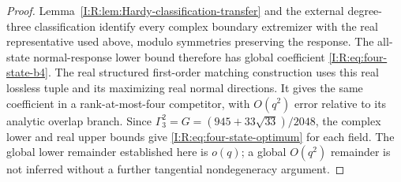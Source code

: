 \begin{proof}
Lemma~\ref{I:R:lem:Hardy-classification-transfer} and the external
degree-three classification identify every complex boundary
extremizer with the real representative used above, modulo symmetries
preserving the response.  The all-state normal-response lower bound
therefore has global coefficient \eqref{I:R:eq:four-state-b4}.
The real structured first-order matching construction uses this real
lossless tuple and its maximizing real normal directions.  It gives
the same coefficient in a rank-at-most-four competitor, with
$O(q^2)$ error relative to its analytic overlap branch.  Since
$\Gamma_3^2=G=(945+33\sqrt{33})/2048$, the complex lower and real
upper bounds give \eqref{I:R:eq:four-state-optimum} for each field.
The global lower remainder established here is $o(q)$; a global
$O(q^2)$ remainder is not inferred without a further tangential
nondegeneracy argument.
\end{proof}
